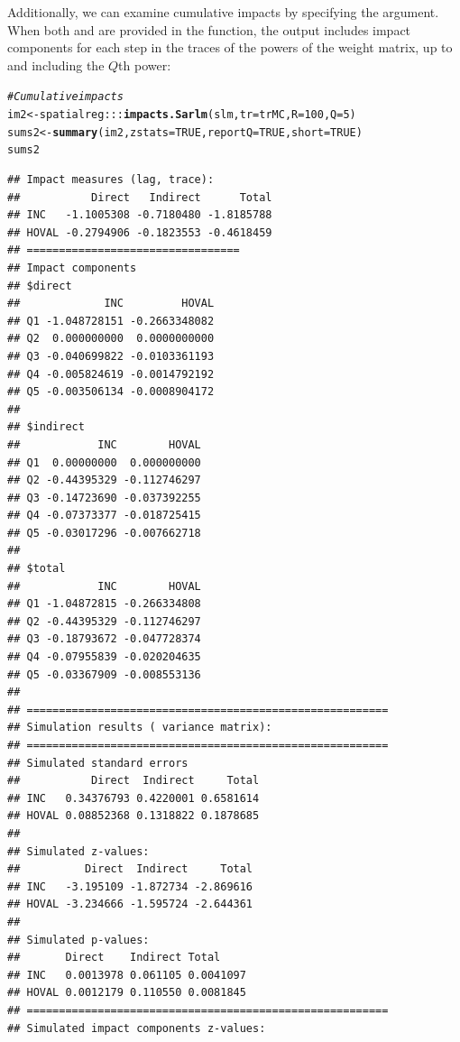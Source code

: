 \documentclass[english,12pt]{book}\usepackage[]{graphicx}\usepackage[]{xcolor}
\makeatletter
\newcommand{\hlnum}[1]{\textcolor[rgb]{0.686,0.059,0.569}{#1}}%
\newcommand{\hlcom}[1]{\textcolor[rgb]{0.678,0.584,0.686}{\textit{#1}}}%
\newcommand{\hlopt}[1]{\textcolor[rgb]{0,0,0}{#1}}%
\newcommand{\hldef}[1]{\textcolor[rgb]{0.345,0.345,0.345}{#1}}%
\newcommand{\hlkwb}[1]{\textcolor[rgb]{0.69,0.353,0.396}{#1}}%
\newcommand{\hlkwc}[1]{\textcolor[rgb]{0.333,0.667,0.333}{#1}}%
\newcommand{\hlkwd}[1]{\textcolor[rgb]{0.737,0.353,0.396}{\textbf{#1}}}%
\newenvironment{kframe}{%
 \def\at@end@of@kframe{}%
 \ifinner\ifhmode%
  \def\at@end@of@kframe{\end{minipage}}%
  \begin{minipage}{\columnwidth}%
 \fi\fi%
 \def\FrameCommand##1{\hskip\@totalleftmargin \hskip-\fboxsep
 \colorbox{shadecolor}{##1}\hskip-\fboxsep
     \hskip-\linewidth \hskip-\@totalleftmargin \hskip\columnwidth}%
 \MakeFramed {\advance\hsize-\width
   \@totalleftmargin\z@ \linewidth\hsize
   \@setminipage}}%
 {\par\unskip\endMakeFramed%
 \at@end@of@kframe}
\newenvironment{knitrout}{}{} %
\makeatother
\begin{document}
Additionally, we can examine cumulative impacts by specifying the  argument. When both  and  are provided in the  function, the output includes impact components for each step in the traces of the powers of the weight matrix, up to and including the $Q$th power:
\begin{knitrout}
\color{fgcolor}\begin{kframe}
\begin{alltt}
\hlcom{# Cumulative impacts}
\hldef{im2}   \hlkwb{<-} \hldef{spatialreg}\hlopt{:::}\hlkwd{impacts.Sarlm}\hldef{(slm,} \hlkwc{tr} \hldef{= trMC,} \hlkwc{R} \hldef{=} \hlnum{100}\hldef{,} \hlkwc{Q} \hldef{=} \hlnum{5}\hldef{)}
\hldef{sums2} \hlkwb{<-} \hlkwd{summary}\hldef{(im2,} \hlkwc{zstats} \hldef{=} \hlnum{TRUE}\hldef{,} \hlkwc{reportQ} \hldef{=} \hlnum{TRUE}\hldef{,} \hlkwc{short} \hldef{=}  \hlnum{TRUE}\hldef{)}
\hldef{sums2}
\end{alltt}
\begin{verbatim}
## Impact measures (lag, trace):
##           Direct   Indirect      Total
## INC   -1.1005308 -0.7180480 -1.8185788
## HOVAL -0.2794906 -0.1823553 -0.4618459
## =================================
## Impact components
## $direct
##             INC         HOVAL
## Q1 -1.048728151 -0.2663348082
## Q2  0.000000000  0.0000000000
## Q3 -0.040699822 -0.0103361193
## Q4 -0.005824619 -0.0014792192
## Q5 -0.003506134 -0.0008904172
## 
## $indirect
##            INC        HOVAL
## Q1  0.00000000  0.000000000
## Q2 -0.44395329 -0.112746297
## Q3 -0.14723690 -0.037392255
## Q4 -0.07373377 -0.018725415
## Q5 -0.03017296 -0.007662718
## 
## $total
##            INC        HOVAL
## Q1 -1.04872815 -0.266334808
## Q2 -0.44395329 -0.112746297
## Q3 -0.18793672 -0.047728374
## Q4 -0.07955839 -0.020204635
## Q5 -0.03367909 -0.008553136
## 
## ========================================================
## Simulation results ( variance matrix):
## ========================================================
## Simulated standard errors
##           Direct  Indirect     Total
## INC   0.34376793 0.4220001 0.6581614
## HOVAL 0.08852368 0.1318822 0.1878685
## 
## Simulated z-values:
##          Direct  Indirect     Total
## INC   -3.195109 -1.872734 -2.869616
## HOVAL -3.234666 -1.595724 -2.644361
## 
## Simulated p-values:
##       Direct    Indirect Total    
## INC   0.0013978 0.061105 0.0041097
## HOVAL 0.0012179 0.110550 0.0081845
## ========================================================
## Simulated impact components z-values:

\end{verbatim}
\end{kframe}
\end{knitrout}
\end{document}
